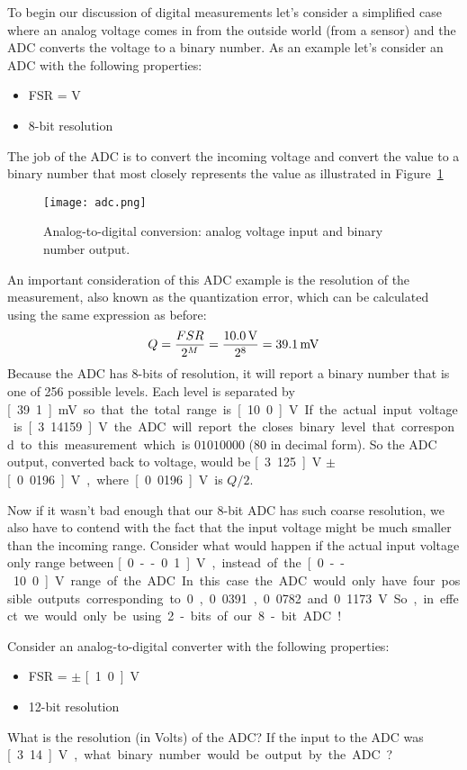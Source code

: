 To begin our discussion of digital measurements let's consider a simplified case where an analog voltage comes in from the outside world (from a sensor) and the ADC converts the voltage to a binary number.  As an example let's consider an ADC with the following properties:
\begin{itemize}
\item FSR = \unit[0--10]{V}
\item 8-bit resolution
\end{itemize}

The job of the ADC is to convert the incoming voltage and convert the value to a binary number that most closely represents the value as illustrated in Figure~\ref{f:adc}
\begin{figure}[hbt!]
\centering
\texttt{[image: adc.png]}
\caption{Analog-to-digital conversion: analog voltage input and binary number output.}
\label{f:adc}
\end{figure}
An important consideration of this ADC example is the resolution of the measurement, also known as the quantization error, which can be calculated using the same expression as before:
\begin{equation}
Q = \frac{FSR}{2^M} = \frac{\unit[10.0]{V}}{2^8} = \unit[39.1]{mV}
\end{equation}
Because the ADC has 8-bits of resolution, it will report a binary number that is one of 256 possible levels.  Each level is separated by \unit[39.1]{mV} so that the total range is \unit[10.0]{V}.  If the actual input voltage is \unit[3.14159]{V} the ADC will report the closes binary level that correspond to this measurement which is $01010000$ (80 in decimal form).  So the ADC output, converted back to voltage, would be \unit[3.125]{V} $\pm$ \unit[0.0196]{V}, where \unit[0.0196]{V} is $Q/2$.  

Now if it wasn't bad enough that our 8-bit ADC has such coarse resolution, we also have to contend with the fact that the input voltage might be much smaller than the incoming range.  Consider what would happen if the actual input voltage only range between \unit[0--0.1]{V}, instead of the \unit[0--10.0]{V} range of the ADC.  In this case the ADC would only have four possible outputs corresponding to 0, 0.0391, 0.0782 and 0.1173 V.  So, in effect we would only be using 2-bits of our 8-bit ADC!

\begin{ex}
Consider an analog-to-digital converter with the following properties:
\begin{itemize}
\item FSR = $\pm$ \unit[1.0]{V}
\item 12-bit resolution
\end{itemize}
What is the resolution (in Volts) of the ADC?  If the input to the ADC was \unit[3.14]{V}, what binary number would be output by the ADC?
\end{ex}


